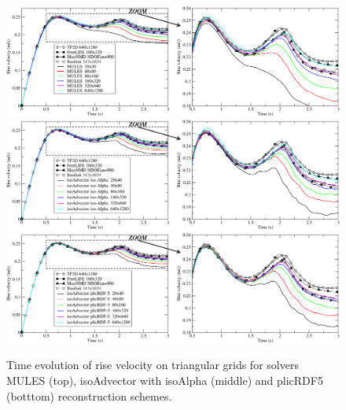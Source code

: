 \documentclass[review]{elsarticle}
\begin{document}
\begin{figure}[!h]
\begin{center}
 \vspace{-1mm}
 \includegraphics[width=\textwidth]{figures/HysingB-uns_bubble_velocity_MULES.pdf}
 \includegraphics[width=\textwidth]{figures/HysingB-uns_bubble_velocity_isoAlpha.pdf}
 \includegraphics[width=\textwidth]{figures/HysingB-uns_bubble_velocity_plicRDF5.pdf}
 \vspace{-14mm}
\end{center}
\caption{Time evolution of rise velocity on triangular grids for solvers MULES (top), isoAdvector with isoAlpha (middle) and plicRDF5 (botttom) reconstruction schemes.}
\label{fig:HB_Uns_bubble_velocity}
\end{figure}
\end{document}
